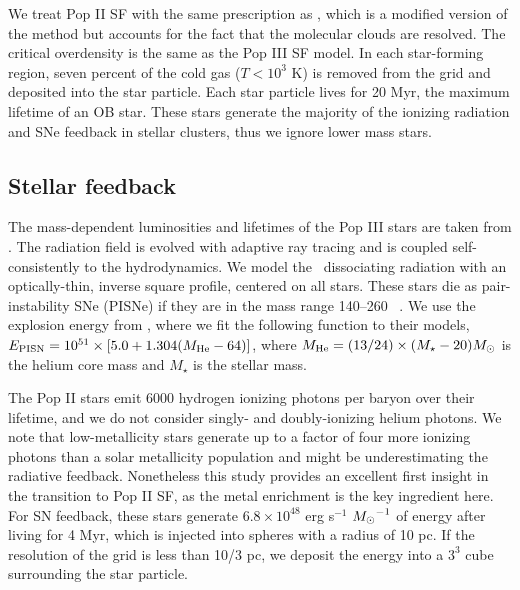 \documentclass[apjl]{emulateapj}
\begin{document}
%

We treat Pop II SF with the same prescription as \citet{Wise09}, which
is a modified version of the \citet{Cen92} method but accounts for the
fact that the molecular clouds are resolved.  The critical overdensity
is the same as the Pop III SF model.  In each star-forming region,
seven percent of the cold gas ($T < 10^3$ K) is removed from the grid
and deposited into the star particle.  Each star particle lives for 20
Myr, the maximum lifetime of an OB star.  These stars generate the
majority of the ionizing radiation and SNe feedback in stellar
clusters, thus we ignore lower mass stars.

\subsection{Stellar feedback}

The mass-dependent luminosities and lifetimes of the Pop III stars are
taken from \citet{Schaerer02}.  The radiation field is evolved with
adaptive ray tracing \citep{Abel02_RT, Wise10} and is coupled
self-consistently to the hydrodynamics.  We model the \hh~dissociating
radiation with an optically-thin, inverse square profile, centered on
all stars.  These stars die as pair-instability SNe (PISNe) if they
are in the mass range 140--260 \Ms~\citep{Heger03}.  We use the
explosion energy from \citet{Heger02}, where we fit the following
function to their models, $E_{\rm PISN} = 10^{51} \times [5.0 + 1.304
(M_{\rm He} - 64)]$, where $M_{\rm He} = (13/24) \times (M_\star - 20)
\Ms$ is the helium core mass and $M_\star$ is the stellar mass.

The Pop II stars emit 6000 hydrogen ionizing photons per baryon over
their lifetime, and we do not consider singly- and doubly-ionizing
helium photons.  We note that low-metallicity stars generate up to a
factor of four more ionizing photons than a solar metallicity
population \citep{Schaerer03} and might be underestimating the
radiative feedback.  Nonetheless this study provides an excellent
first insight in the transition to Pop II SF, as the metal enrichment
is the key ingredient here.  For SN feedback, these stars generate
$6.8 \times 10^{48}$ erg s$^{-1}$ $\Ms^{-1}$ of energy after living
for 4 Myr, which is injected into spheres with a radius of 10 pc.  If
the resolution of the grid is less than 10/3 pc, we deposit the energy
into a $3^3$ cube surrounding the star particle.
\end{document}
